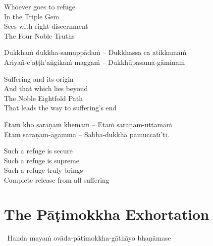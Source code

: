 \begin{english-verses}
  Whoever goes to refuge\\
  In the Triple Gem\\
  Sees with right discernment\\
  The Four Noble Truths
\end{english-verses}

\begin{verses}
  Dukkhaṁ dukkha-samuppādaṁ – Dukkhassa ca atikkamaṁ\\
  Ariyañ-c'aṭṭh'aṅgikaṁ maggaṁ – Dukkhūpasama-gāminaṁ
\end{verses}

\begin{english-verses}
  Suffering and its origin\\
  And that which lies beyond\\
  The Noble Eightfold Path\\
  That leads the way to suffering's end
\end{english-verses}

\begin{verses}
  Etaṁ kho saraṇaṁ khemaṁ – Etaṁ saraṇam-uttamaṁ\\
  Etaṁ saraṇam-āgamma – Sabba-dukkhā pamuccatī'ti.
\end{verses}

\begin{english-verses}
  Such a refuge is secure\\
  Such a refuge is supreme\\
  Such a refuge truly brings\\
  Complete release from all suffering
\end{english-verses}

\suttaRef{[Dhp 188-192]}


\section{The Pāṭimokkha Exhortation}
\label{patimokkha-exhortation}

\begin{leader}
  \anglebracketleft\ \hspace{-0.5mm}Handa mayaṁ ovāda-pāṭimokkha-gāthāyo bhaṇāmase \hspace{-0.5mm}\anglebracketright\
\end{leader}

